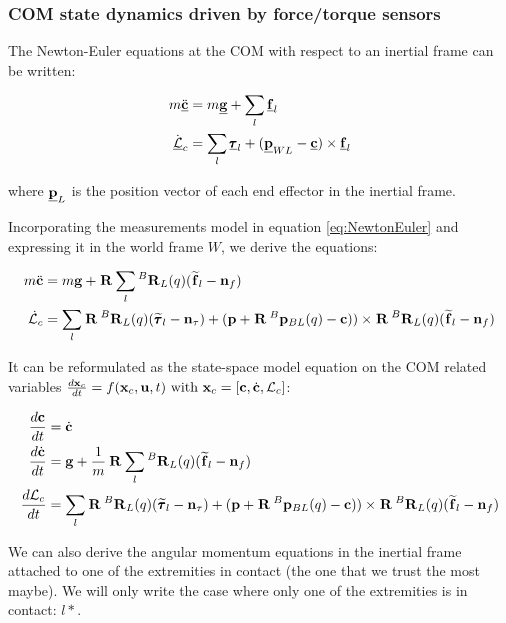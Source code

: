 \documentclass[11pt]{article}
\newcommand{\Rot}[2]{\prescript{#1}{}{\bfR}_{#2}}
\newcommand{\noise}{\bfn}
\newcommand{\posiv}[1]{\underline{\bfp}_{#1}}
\newcommand{\posi}[2]{\prescript{#1}{}{\bfp}_{#2}}
\newcommand{\forcev}[1]{\underline{\bff}_{#1}}
\newcommand{\forcem}[2]{\prescript{#1}{}{\widetilde{\bff}}_{#2}}
\newcommand{\torquev}[1]{\underline{\pmb{\tau}}_{#1}}
\newcommand{\torquem}[2]{\prescript{#1}{}{\widetilde{\pmb{\tau}}}_{#2}}
\newcommand{\AM}{\mathcal{L}}
\newcommand{\AMv}{\underline{\mathcal{L}}}
\newcommand{\COM}{\bfc}
\newcommand{\COMv}{\underline{\bfc}}
\newcommand{\gravv}{\underline{\bfg}}
\begin{document}
\subsubsection{COM state dynamics driven by force/torque sensors}
The Newton-Euler equations at the COM with respect to an inertial frame can be written:

\begin{equation}
\begin{split}
m\ddot{\COMv}&= m\gravv + \sum_l \forcev{l}
\\
\dot{\AMv}_c&= \sum_l \torquev{l} + ( \posiv{WL} - \COMv) \times \forcev{l} 
\end{split}
\label{eq:NewtonEuler}
\end{equation}

where \(\posiv{L} \) is the position vector of each end effector in the inertial frame.

Incorporating the measurements model in equation \ref{eq:NewtonEuler} and expressing it in the world frame \(W\), we derive the equations:

\begin{equation}
\begin{split}
m\ddot{\COM}&= 
m\bfg + \Rot{}{} \sum_l \Rot{B}{L}(q) (\forcem{}{l} - \noise_f) 
\\
\dot{\AM}_c&= 
\sum_l \Rot{}{}\Rot{B}{L}(q)(\torquem{}{l} - \noise_{\tau}) + (\bfp +
\Rot{}{}\posi{B}{BL}(q) - \COM)) \times \Rot{}{}\Rot{B}{L}(q)(\forcem{}{l} - \noise_f)  
\end{split}
\end{equation}

It can be reformulated as the state-space model equation on the COM related variables \( \frac{d\bfx_c}{dt}= f(\bfx_c, \bfu, t)$ with $\bfx_c = [\COM, \dot{\COM}, \AM_c]\):

\begin{equation}
\begin{split}
\frac{d\COM}{dt} &= \dot{\COM} 
\\
\frac{d\dot{\bfc}}{dt}&= \bfg + \frac{1}{m} \Rot{}{} \sum_l \Rot{B}{L}(q) (\forcem{}{l} - \noise_f) 
\\
\frac{d\AM_c}{dt}&= \sum_l \Rot{}{}\Rot{B}{L}(q)(\torquem{}{l} - \noise_{\tau}) + (\bfp +
\Rot{}{}\posi{B}{BL}(q) - \COM)) \times \Rot{}{}\Rot{B}{L}(q)(\forcem{}{l} - \noise_f)
\end{split}
\label{eq:COMContinuous}
\end{equation}

We can also derive the angular momentum equations in the inertial frame attached to one of the extremities in contact (the one that we trust the most maybe). We will only write the case where only one of the extremities is in contact: \(l*\).
\end{document}
